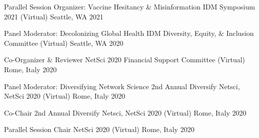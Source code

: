 
\vspace{2mm}

\begin{cvhonors}

\cvhonor
	{Parallel Session Organizer: Vaccine Hesitancy \& Misinformation} %
	{IDM Symposium 2021} %
	{(Virtual) Seattle, WA} %
	{2021} %

\cvhonor
	{Panel Moderator: Decolonizing Global Health} %
	{IDM Diversity, Equity, \& Inclusion Committee} %
	{(Virtual) Seattle, WA} %
	{2020} %

\cvhonor
	{Co-Organizer \& Reviewer} %
	{NetSci 2020 Financial Support Committee} %
	{(Virtual) Rome, Italy} %
	{2020} %

\cvhonor
	{Panel Moderator: Diversifying Network Science} %
	{2nd Annual Diversify Netsci, NetSci 2020} %
	{(Virtual) Rome, Italy} %
	{2020} %

\cvhonor
	{Co-Chair} %
	{2nd Annual Diversify Netsci, NetSci 2020} %
	{(Virtual) Rome, Italy} %
	{2020} %


\cvhonor
	{Parallel Session Chair} %
	{NetSci 2020} %
	{(Virtual) Rome, Italy} %
	{2020} %


\end{cvhonors}
